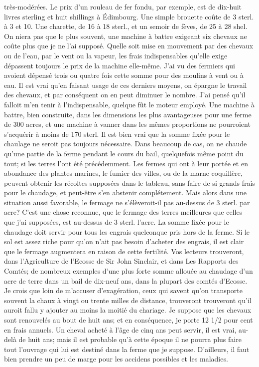 très-modérées. Le prix d'un rouleau de fer fondu, par exemple, est de dix-huit livres sterling et huit shillings à Édimbourg. Une simple brouette coûte de 3 sterl. à 3 et 10. Une charette, de 16 à 18 sterl., et un semoir de fèves, de 25 à 28 shel. On niera pas que le plus souvent, une machine à battre exigeant six chevaux ne coûte plus que je ne l'ai supposé. Quelle soit mise en mouvement par des chevaux ou de l'eau, par le vent ou la vapeur, les frais indispensables qu'elle exige dépassent toujours le prix de la machine elle-même. J'ai vu des fermiers qui avoient dépensé trois ou quatre fois cette somme pour des moulins à vent ou à eau. Il est vrai qu'en faisant usage de ces derniers moyens, on épargne le travail des chevaux, et par conséquent on en peut diminuer le nombre. J'ai pensé qu'il falloit m'en tenir à l'indispensable, quelque fût le moteur employé. Une machine à battre, bien construite, dans les dimensions les plus avantageuses pour une ferme de 300 acres, et une machine à vanner dans les mêmes proportions ne pourroient s'acquérir à moins de 170 sterl.
Il est bien vrai que la somme fixée pour le chaulage ne seroit pas toujours nécessaire. Dans beaucoup de cas, on ne chaude\setcounter{page}{316} qu'une partie de la ferme pendant le cours du bail, quelquefois même point du tout; si les terres l'ont été précédemment. Les fermes qui ont à leur portée et en abondance des plantes marines, le fumier des villes, ou de la marne coquillère, peuvent obtenir les récoltes supposées dans le tableau, sans faire de si grands frais pour le chaudage, et peut-être s'en abstenir complétement. Mais alors dans une situation aussi favorable, le fermage ne s'élèveroit-il pas au-dessus de 3 sterl. par acre? C'est une chose reconnue, que le fermage des terres meilleures que celles que j'ai supposées, est au-dessus de 3 sterl. l'acre. La somme fixée pour le chaudage doit servir pour tous les engrais quelconque pris hors de la ferme. Si le sol est assez riche pour qu'on n'ait pas besoin d'acheter des engrais, il est clair que le fermage augmentera en raison de cette fertilité. Vos lecteurs trouveront, dans l'Agriculture de l'Ecosse de Sir John Sinclair, et dans Les Rapports des Comtés; de nombreux exemples d'une plus forte somme allouée au chaudage d'un acre de terre dans un bail de dix-neuf ans, dans la plupart des comtés d'Ecosse. Je crois que loin de m'accuser d'exagération, ceux qui savent qu'on transporte souvent la chaux à vingt ou trente milles de distance, trouveront\setcounter{page}{317} trouveront qu'il auroit fallu y ajouter au moins la moitié du chariage.
Je suppose que les chevaux sont renouvelés au bout de huit ans; et en conséquence, je porte 12 1/2 pour cent en frais annuels. Un cheval acheté à l'âge de cinq ans peut servir, il est vrai, au-delà de huit ans; mais il est probable qu'à cette époque il ne pourra plus faire tout l'ouvrage qui lui est destiné dans la ferme que je suppose. D'ailleurs, il faut bien prendre un peu de marge pour les accidens possibles et les maladies.
